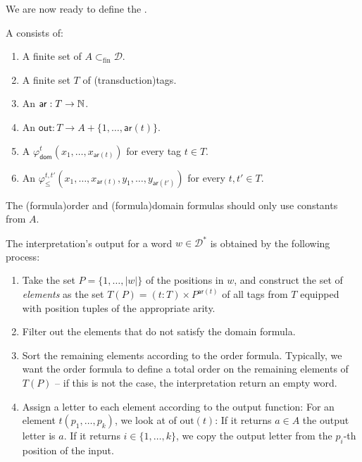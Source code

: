 \noindent
We are now ready to define the .
\begin{definition}
A  consists of:
\begin{enumerate}
\item A finite set of  $A \subset_{\textrm{fin}}\mathcal{D}$.
\item A finite set $T$ of \intro(transduction){tags}.
\item An  $\mathsf{ar} : T \to \mathbb{N}$.
\item An  $\mathsf{out} : T \to A + \{1, \ldots, \mathsf{ar}(t)\}$. 
\item A  $\varphi_{\mathsf{dom}}^t(x_1,\ldots,x_{\mathsf{ar}(t)})$ 
    for every tag $t \in T$.
\item An  $\varphi_{\leq}^{t,t'}(x_1,\ldots,x_{\mathsf{ar}(t)},y_1,\ldots,y_{\mathsf{ar}(t')})$ for every $t,t' \in T$. 
\end{enumerate}
The \kl(formula){order} and \kl(formula){domain} formulas should only use constants from $A$.
\end{definition}
\noindent
The interpretation's output for a word $w \in \mathcal{D}^*$ is obtained by the following process:
\begin{enumerate}
    \item  Take the set $P = \{1, \ldots, |w|\}$ of the positions in $w$, and construct the set 
           of \emph{elements} as the set $T(P) = (t : T) \times P^{\mathsf{ar}(t)}$
           of all tags from $T$ equipped with position tuples of the appropriate arity.
    \item Filter out the elements that do not satisfy the domain formula.
    \item Sort the remaining elements according to the order formula. Typically, we 
          want the order formula to define a total order on the remaining elements of $T(P)$ -- 
          if this is not the case, the interpretation return an empty word.
    \item Assign a letter to each element according to the output function: For an 
          element $t(p_1, \ldots, p_k)$, we look at of $\text{out}(t)$: If it returns $a \in A$
          the output letter is $a$. If it returns $i \in \{1, \ldots, k\}$, we copy the output letter from the
          $p_i$-th position of the input.
          
\end{enumerate}

